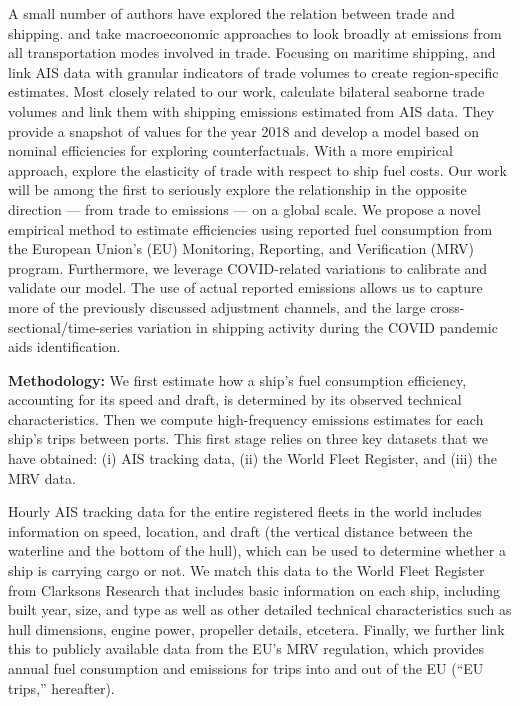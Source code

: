 \documentclass[hidelinks, 12pt,letterpaper]{article}
\begin{document}
A small number of authors have explored the relation between trade and shipping. \citet{cristea2013trade} and \citet{shapiro2016trade} take macroeconomic approaches to look broadly at emissions from all transportation modes involved in trade. Focusing on maritime shipping, \citet{van2018spatially} and \citet{liu2019emissions} link AIS data with granular indicators of trade volumes to create region-specific estimates. Most closely related to our work, \citet{wang2021trade} calculate bilateral seaborne trade volumes and link them with shipping emissions estimated from AIS data. They provide a snapshot of values for the year 2018 and develop a model based on nominal efficiencies for exploring counterfactuals. With a more empirical approach, \citet{brancaccio2018impact} explore the elasticity of trade with respect to ship fuel costs. Our work will be among the first to seriously explore the relationship in the opposite direction --- from trade to emissions --- on a global scale. We propose a novel empirical method to estimate efficiencies using reported fuel consumption from the European Union's (EU) Monitoring, Reporting, and Verification (MRV) program. Furthermore, we leverage COVID-related variations to calibrate and validate our model. The use of actual reported emissions allows us to capture more of the previously discussed adjustment channels, and the large cross-sectional/time-series variation in shipping activity during the COVID pandemic aids identification. %

 \smallskip

\noindent \textbf{Methodology:}  We first estimate how a ship's fuel consumption efficiency, accounting for its speed and draft, is determined by its observed technical characteristics. Then we compute high-frequency emissions estimates for each ship's trips between ports. This first stage relies on three key datasets that we have obtained: (i) AIS tracking data, (ii) the World Fleet Register, and (iii) the MRV data.


Hourly AIS tracking data for the entire registered fleets in the world includes information on speed, location, and draft (the vertical distance between the waterline and the bottom of the hull), which can be used to determine whether a ship is carrying cargo or not. We match this data to the World Fleet Register from Clarksons Research that includes basic  information on each ship, including built year, size, and type as well as other detailed technical characteristics such as hull dimensions, engine power, propeller details, etcetera. Finally, we further link this to publicly available data from the EU's MRV regulation, which provides annual fuel consumption and emissions for trips into and out of the EU (``EU trips,'' hereafter). %
\end{document}
